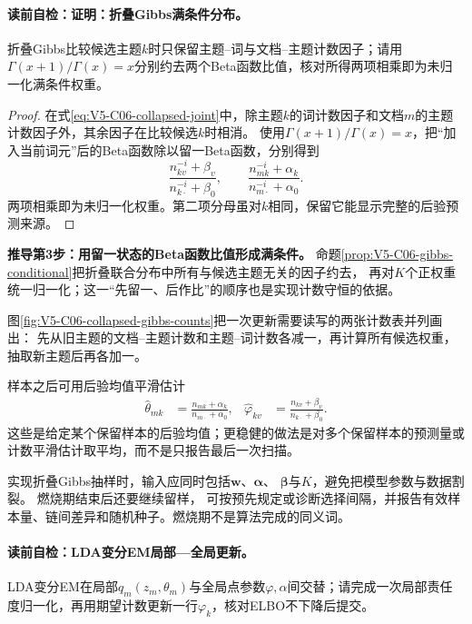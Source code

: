 \paragraph{读前自检：证明：折叠Gibbs满条件分布。}折叠Gibbs比较候选主题$k$时只保留主题--词与文档--主题计数因子；请用$\Gamma(x+1)/\Gamma(x)=x$分别约去两个Beta函数比值，核对所得两项相乘即为未归一化满条件权重。\par

\begin{proof}
在式\eqref{eq:V5-C06-collapsed-joint}中，除主题$k$的词计数因子和文档$m$的主题计数因子外，其余因子在比较候选$k$时相消。
使用$\Gamma(x+1)/\Gamma(x)=x$，把“加入当前词元”后的Beta函数除以留一Beta函数，分别得到
\[
\frac{n_{kv}^{-i}+\beta_v}{n_{k\cdot}^{-i}+\beta_0},
\qquad
\frac{n_{mk}^{-i}+\alpha_k}{n_{m\cdot}^{-i}+\alpha_0}.
\]
两项相乘即为未归一化权重。第二项分母虽对$k$相同，保留它能显示完整的后验预测来源。
\end{proof}

\textbf{推导第3步：用留一状态的Beta函数比值形成满条件。}
命题\ref{prop:V5-C06-gibbs-conditional}把折叠联合分布中所有与候选主题无关的因子约去，
再对$K$个正权重统一归一化；这一“先留一、后作比”的顺序也是实现计数守恒的依据。

图\ref{fig:V5-C06-collapsed-gibbs-counts}把一次更新需要读写的两张计数表并列画出：
先从旧主题的文档--主题计数和主题--词计数各减一，再计算所有候选权重，抽取新主题后再各加一。


样本之后可用后验均值平滑估计
\begin{align}
\widehat\theta_{mk}
&=\frac{n_{mk}+\alpha_k}{n_{m\cdot}+\alpha_0},
&
\widehat\varphi_{kv}
&=\frac{n_{kv}+\beta_v}{n_{k\cdot}+\beta_0}.
\label{eq:V5-C06-gibbs-postprocess}
\end{align}
这些是给定某个保留样本的后验均值；更稳健的做法是对多个保留样本的预测量或计数平滑估计取平均，而不是只报告最后一次扫描。

\begin{implementationbox}
实现折叠Gibbs抽样时，输入应同时包括$\boldsymbol w$、$\boldsymbol\alpha$、
$\boldsymbol\beta$与$K$，避免把模型参数与数据割裂。
燃烧期结束后还要继续留样，
可按预先规定或诊断选择间隔，并报告有效样本量、链间差异和随机种子。燃烧期不是算法完成的同义词。
\end{implementationbox}

\paragraph{读前自检：LDA变分EM局部—全局更新。}LDA变分EM在局部$q_m(z_m,\theta_m)$与全局点参数$\varphi,\alpha$间交替；请完成一次局部责任度归一化，再用期望计数更新一行$\varphi_k$，核对ELBO不下降后提交。\par
